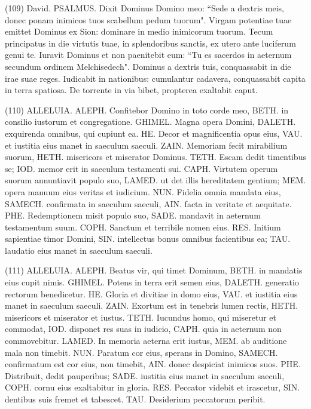 \begin{biblechapter}  (109) 
\verse  David. PSALMUS. Dixit Dominus Domino meo: “Sede a dextris meis, donec ponam inimicos tuos scabellum pedum tuorum". 
\verse Virgam potentiae tuae emittet Dominus ex Sion: dominare in medio inimicorum tuorum. 
\verse Tecum principatus in die virtutis tuae, in splendoribus sanctis, ex utero ante luciferum genui te. 
\verse Iuravit Dominus et non paenitebit eum: “Tu es sacerdos in aeternum secundum ordinem Melchisedech". 
\verse Dominus a dextris tuis, conquassabit in die irae suae reges. 
\verse Iudicabit in nationibus: cumulantur cadavera, conquassabit capita in terra spatiosa. 
\verse De torrente in via bibet, propterea exaltabit caput. 
\end{biblechapter}

\begin{biblechapter}  (110) 
\verse ALLELUIA. ALEPH. Confitebor Domino in toto corde meo, BETH. in consilio iustorum et congregatione. 
\verse GHIMEL. Magna opera Domini, DALETH. exquirenda omnibus, qui cupiunt ea. 
\verse HE. Decor et magnificentia opus eius, VAU. et iustitia eius manet in saeculum saeculi. 
\verse ZAIN. Memoriam fecit mirabilium suorum, HETH. misericors et miserator Dominus. 
\verse TETH. Escam dedit timentibus se; IOD. memor erit in saeculum testamenti sui. 
\verse CAPH. Virtutem operum suorum annuntiavit populo suo, LAMED. ut det illis hereditatem gentium; 
\verse MEM. opera manuum eius veritas et iudicium. NUN. Fidelia omnia mandata eius, 
\verse SAMECH. confirmata in saeculum saeculi, AIN. facta in veritate et aequitate. 
\verse PHE. Redemptionem misit populo suo, SADE. mandavit in aeternum testamentum suum. COPH. Sanctum et terribile nomen eius. 
\verse RES. Initium sapientiae timor Domini, SIN. intellectus bonus omnibus facientibus ea; TAU. laudatio eius manet in saeculum saeculi. 
\end{biblechapter}

\begin{biblechapter}  (111) 
\verse ALLELUIA. ALEPH. Beatus vir, qui timet Dominum, BETH. in mandatis eius cupit nimis. 
\verse GHIMEL. Potens in terra erit semen eius, DALETH. generatio rectorum benedicetur. 
\verse HE. Gloria et divitiae in domo eius, VAU. et iustitia eius manet in saeculum saeculi. 
\verse ZAIN. Exortum est in tenebris lumen rectis, HETH. misericors et miserator et iustus. 
\verse TETH. Iucundus homo, qui miseretur et commodat, IOD. disponet res suas in iudicio, 
\verse CAPH. quia in aeternum non commovebitur. LAMED. In memoria aeterna erit iustus, 
\verse MEM. ab auditione mala non timebit. NUN. Paratum cor eius, sperans in Domino, 
\verse SAMECH. confirmatum est cor eius, non timebit, AIN. donec despiciat inimicos suos. 
\verse PHE. Distribuit, dedit pauperibus; SADE. iustitia eius manet in saeculum saeculi, COPH. cornu eius exaltabitur in gloria. 
\verse RES. Peccator videbit et irascetur, SIN. dentibus suis fremet et tabescet. TAU. Desiderium peccatorum peribit. 
\end{biblechapter}

